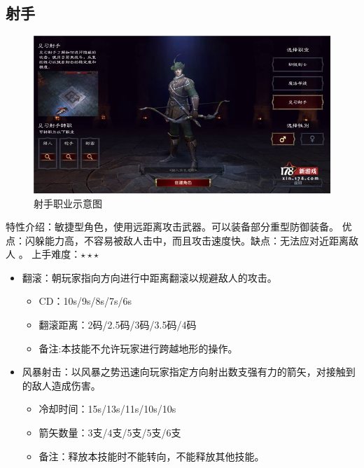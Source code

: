 \documentclass[UTF8,AutoFakeBold=1,AutoFakeSlant,zihao=-4]{cucthesis}
\begin{document}
\subsection{射手}
\begin{figure}[ht]
    \centering
    \includegraphics[scale=0.5]{imgs/射手.jpg}    
    \caption{射手职业示意图}
\end{figure}

特性介绍：敏捷型角色，使用远距离攻击武器。可以装备部分重型防御装备。 
优点：闪躲能力高，不容易被敌人击中，而且攻击速度快。缺点：无法应对近距离敌人 。
上手难度：$\star\star\star$

\begin{itemize}
    \item 翻滚：朝玩家指向方向进行中距离翻滚以规避敌人的攻击。
    \begin{itemize}
        \item CD：10s/9s/8s/7s/6s
        \item 翻滚距离：2码/2.5码/3码/3.5码/4码
        \item 备注:本技能不允许玩家进行跨越地形的操作。
    \end{itemize}

    \item 风暴射击：以风暴之势迅速向玩家指定方向射出数支强有力的箭矢，对接触到的敌人造成伤害。
    \begin{itemize}
        \item 冷却时间：15s/13s/11s/10s/10s
        \item 箭矢数量：3支/4支/5支/5支/6支
        \item 备注：释放本技能时不能转向，不能释放其他技能。
    \end{itemize}
\end{itemize}
\end{document}
